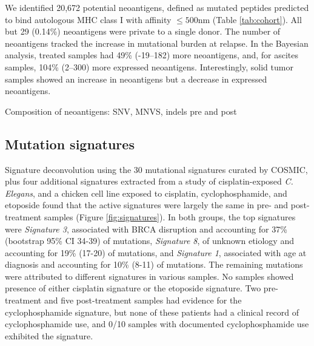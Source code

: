 We identified 20,672 potential neoantigens, defined as mutated peptides predicted to bind autologous MHC class I with affinity $\leq 500$nm (Table \ref{tab:cohort}). All but 29 (0.14\%) neoantigens were private to a single donor. The number of neoantigens tracked the increase in mutational burden at relapse. In the Bayesian analysis, treated samples had 49\% (-19--182) more neoantigens, and, for ascites samples, 104\% (2--300) more expressed neoantigens. Interestingly, solid tumor samples showed an increase in neoantigens but a decrease in expressed neoantigens.

Composition of neoantigens: SNV, MNVS, indels pre and post


\subsection*{Mutation signatures}
Signature deconvolution using the 30 mutational signatures curated by COSMIC\cite{364242}, plus four additional signatures extracted from a study of cisplatin-exposed \textit{C. Elegans}\cite{Meier_2014}, and a chicken cell line exposed to cisplatin, cyclophosphamide, and etoposide\cite{Szikriszt_2016} found that the active signatures were largely the same in pre- and post-treatment samples (Figure \ref{fig:signatures}). In both groups, the top signatures were \textit{Signature 3}, associated with BRCA disruption and accounting for 37\% (bootstrap 95\% CI 34-39) of mutations, \textit{Signature 8}, of unknown etiology and accounting for 19\% (17-20) of mutations, and \textit{Signature 1}, associated with age at diagnosis and accounting for 10\% (8-11) of mutations. The remaining mutations were attributed to different signatures in various samples. No samples showed presence of either cisplatin signature or the etoposide signature. Two pre-treatment and five post-treatment samples had evidence for the cyclophosphamide signature, but none of these patients had a clinical record of cyclophosphamide use, and 0/10 samples with documented cyclophosphamide use exhibited the signature.

